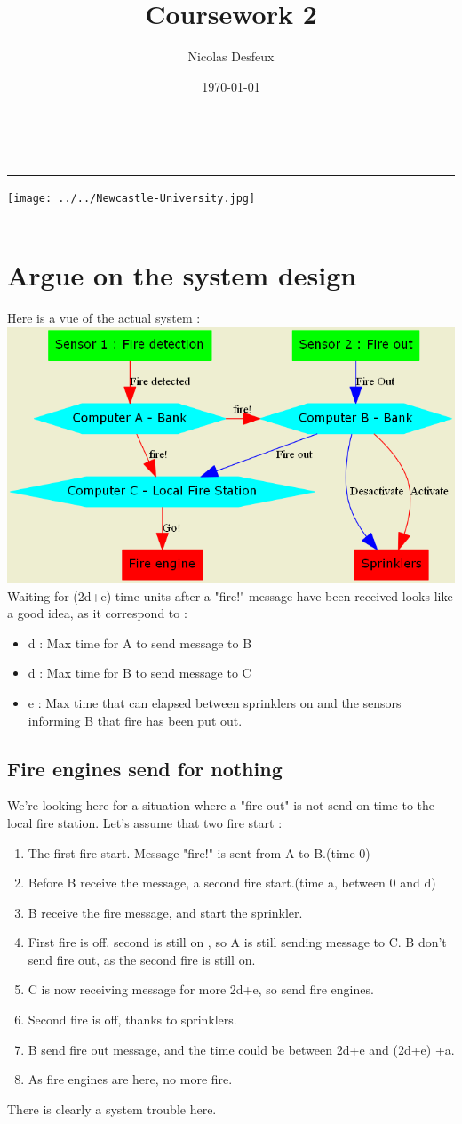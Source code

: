 \documentclass[a4paper,11pt]{article} %
\date{\today}
\author{Nicolas Desfeux}
\title{
{Coursework 2
}}
\makeatletter
\def\maketitle{

	\begin{multicols}{2}
		{\begin{center}
		{\LARGE \@title}\\
		\rule{3cm}{1pt}
	\end{center}}
		\begin{flushright}
			{\texttt{[image: ../../Newcastle-University.jpg]}}\\
			{\@date}\\
		\end{flushright}
	\end{multicols}	
	\vspace{1cm}
}
\makeatother
\begin{document}
\maketitle
{}

\section{Argue on the system design}
Here is a vue of the actual system : \\
\includegraphics[width=1.2\linewidth]{ex2.png}
Waiting for (2d+e) time units after a "fire!" message have been received looks like a good idea, as it correspond to : 
\begin{itemize}
\item d : Max time for A to send message to B
\item d : Max time for B to send message to C
\item e : Max time that can elapsed between sprinklers on and the sensors informing B that fire has been put out.
\end{itemize}
\subsection{Fire engines send for nothing}
We're looking here for a situation where a "fire out" is not send on time to the local fire station.
Let's assume that two fire start : 
\begin{enumerate}
\item The first fire start. Message "fire!" is sent from A to B.(time 0)
\item Before B receive the message, a second fire start.(time a, between 0 and d)
\item B receive the fire message, and start the sprinkler.
\item First fire is off. second is still on , so A is still sending message to C. B don't send fire out, as the second fire is still on.
\item C is now receiving message for more 2d+e, so send fire engines.
\item Second fire is off, thanks to sprinklers. 
\item B send fire out message, and the time could be between 2d+e and (2d+e) +a.
\item As fire engines are here, no more fire.
\end{enumerate}
There is clearly a system trouble here.
\end{document}
